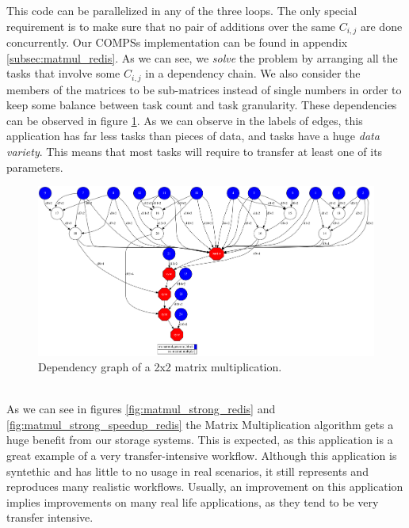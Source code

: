 This code can be parallelized in any of the three loops. The only special requirement is to make sure that no pair of additions over the same $C_{i, j}$ are done concurrently. Our COMPSs implementation can be found in appendix \ref{subsec:matmul_redis}. As we can see, we \textit{solve} the problem by arranging all the tasks that involve some $C_{i, j}$ in a dependency chain. We also consider the members of the matrices to be sub-matrices instead of single numbers in order to keep some balance between task count and task granularity. These dependencies can be observed in figure \ref{fig:matmul_redis_dep_graph}. As we can observe in the labels of edges, this application has far less tasks than pieces of data, and tasks have a huge \textit{data variety}. This means that most tasks will require to transfer at least one of its parameters.\\
\begin{figure}
\centering
\includegraphics[scale = 0.2]{figures/matmul_storage_dep_graph.png}
\caption{Dependency graph of a 2x2 matrix multiplication.}
\label{fig:matmul_redis_dep_graph}
\end{figure}
\\
As we can see in figures \ref{fig:matmul_strong_redis} and \ref{fig:matmul_strong_speedup_redis} the Matrix Multiplication algorithm gets a huge benefit from our storage systems. This is expected, as this application is a great example of a very transfer-intensive workflow. Although this application is syntethic and has little to no usage in real scenarios, it still represents and reproduces many realistic workflows. Usually, an improvement on this application implies improvements on many real life applications, as they tend to be very transfer intensive.


